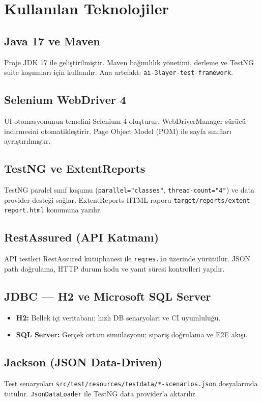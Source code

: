 \chapter{Kullanılan Teknolojiler}

\section{Java 17 ve Maven}
Proje JDK 17 ile geliştirilmiştir. Maven bağımlılık yönetimi, derleme ve TestNG suite koşumları için kullanılır. Ana artefakt: \texttt{ai-3layer-test-framework}.

\section{Selenium WebDriver 4}
UI otomasyonunun temelini Selenium 4 oluşturur. WebDriverManager sürücü indirmesini otomatikleştirir. Page Object Model (POM) ile sayfa sınıfları ayrıştırılmıştır.

\section{TestNG ve ExtentReports}
TestNG paralel sınıf koşumu (\texttt{parallel="classes"}, \texttt{thread-count="4"}) ve data provider desteği sağlar. ExtentReports HTML raporu \texttt{target/reports/extent-report.html} konumuna yazılır.

\section{RestAssured (API Katmanı)}
API testleri RestAssured kütüphanesi ile \texttt{reqres.in} üzerinde yürütülür. JSON path doğrulama, HTTP durum kodu ve yanıt süresi kontrolleri yapılır.

\section{JDBC — H2 ve Microsoft SQL Server}
\begin{itemize}
  \item \textbf{H2:} Bellek içi veritabanı; hızlı DB senaryoları ve CI uyumluluğu.
  \item \textbf{SQL Server:} Gerçek ortam simülasyonu; sipariş doğrulama ve E2E akışı.
\end{itemize}

\section{Jackson (JSON Data-Driven)}
Test senaryoları \texttt{src/test/resources/testdata/*-scenarios.json} dosyalarında tutulur. \texttt{JsonDataLoader} ile TestNG data provider'a aktarılır.

